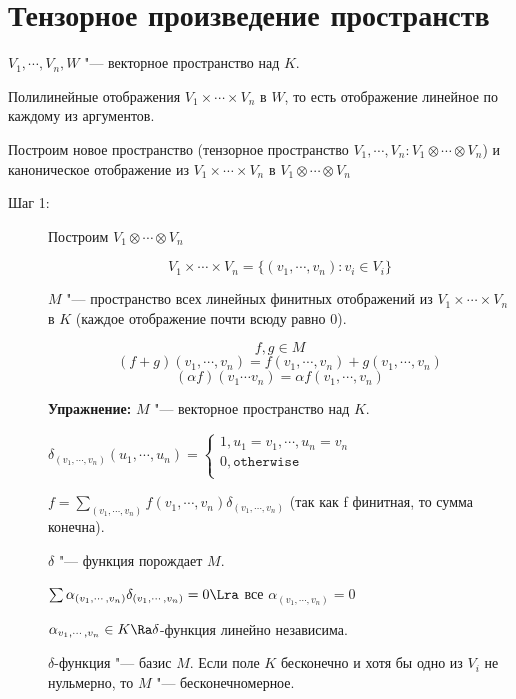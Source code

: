 ﻿\section{Тензорное произведение пространств}

$V_1, \cdots, V_n, W$ "--- векторное пространство над $K$.

Полилинейные отображения $V_1 \times \cdots \times V_n$ в $W$,
то есть отображение линейное по каждому из аргументов. 

Построим новое пространство (тензорное пространство $V_1, \cdots, V_n \colon V_1 \otimes \cdots \otimes V_n$)  
и каноническое отображение из $V_1 \times \cdots \times V_n$ в $V_1 \otimes \cdots \otimes V_n$

\begin{description}
    \item[Шаг 1:]
    Построим $V_1 \otimes \cdots \otimes V_n$
    
    $$V_1 \times \cdots \times V_n = \{(v_1, \cdots, v_n)\colon v_i \in V_i\}$$

    $M$ "--- пространство всех линейных финитных отображений из $V_1 \times \cdots \times V_n$ в $K$
    (каждое отображение почти всюду равно 0).

    $$f, g \in M$$
    $$(f + g)(v_1, \cdots, v_n) = f(v_1, \cdots, v_n) + g(v_1, \cdots, v_n)$$
    $$(\alpha f)(v_1 \cdots v_n) = \alpha f(v_1, \cdots, v_n)$$

   \textbf{Упражнение:} $M$ "--- векторное пространство над $K$.

    $\delta_{(v_1,\cdots, v_n)}(u_1, \cdots, u_n) = \left\{
    \begin{aligned}
    1,  u_1 = v_1, \cdots, u_n = v_n\\
    0, \texttt{otherwise}\\ 
    \end{aligned}
    \right.$

    $f = \sum_{(v_1, \cdots, v_n)} f(v_1, \cdots, v_n)\delta_{(v_1, \cdots, v_n)}$ 
    (так как f финитная, то сумма конечна). 

    $\delta$ "--- функция порождает $M$.

    $\sum \alpha_{(v_1, \cdots, v_n)} \delta_{(v_1, \cdots, v_n)} = 0 \Lra$  все $\alpha_{(v_1, \cdots, v_n)} = 0$ 

    $\alpha_{v_1, \cdots, v_n} \in K \Ra \delta$-функция линейно независима. 

    $\delta$-функция "--- базис $M$.
    Если поле $K$ бесконечно и хотя бы одно из $V_i$ не нульмерно, то 
    $M$ "--- бесконечномерное. 
    

\end{description}

